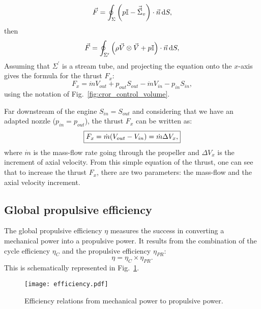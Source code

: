 \begin{equation}
	\vec{F} = \oint_{\Sigma} \left(p \mathbb{I} - 
	\vec{\vec{\Sigma}}_v \right) \cdot \vec{n} \mathop{}\!\mathrm{d} S,
\end{equation}
then
\begin{equation}
	\vec{F} = \oint_{\Sigma^\prime} \left(\rho \vec{V} \otimes \vec{V} +
	p \mathbb{I} \right) \cdot \vec{n} \mathop{}\!\mathrm{d} S,
\end{equation}
Assuming that $\Sigma^\prime$ is a stream tube, and projecting the equation
onto the $x$-axis gives the formula for the thrust $F_x$:
\begin{equation}
	F_x = \dot{m} V_{out} + p_{out} S_{out}
	- \dot{m} V_{in} - p_{in} S_{in},
\end{equation}
using the notation of Fig.~\ref{fig:cror_control_volume}.

Far downstream of the engine $S_{in} = S_{out}$ and
considering that we have an adapted nozzle ($p_{in} = p_{out}$),
the thrust $F_x$ can be written as:
\begin{equation}
	\fbox{$
	F_x = \dot{m} (V_{out} - V_{in}) = \dot{m} \Delta V_x,
	$}
	\label{eq:cror_thrust}
\end{equation}
where $\dot{m}$ is the mass-flow rate going through the
propeller and $\Delta V_x$ is
the increment of axial velocity. From this simple equation of the thrust,
one can see that to increase the thrust $F_x$, there are two parameters:
the mass-flow and the axial velocity increment.

\subsection{Global propulsive efficiency}
\label{sub:cror_efficiency}

The global propulsive efficiency $\eta$ measures the 
success in converting a mechanical power into a
propulsive power. It results from the combination
of the cycle efficiency $\eta_{C}$ and the propulsive efficiency
$\eta_{PR}$:
\begin{equation}
	\eta = \eta_{C} \times \eta_{PR}.
\end{equation}
This is schematically represented in Fig.~\ref{fig:cror_efficiency}.
\begin{figure}[htb]
  \centering
  \texttt{[image: efficiency.pdf]}
  \caption{Efficiency relations from mechanical power to propulsive power.}
  \label{fig:cror_efficiency}
\end{figure}

